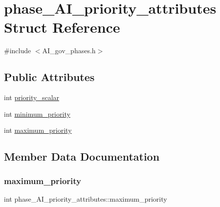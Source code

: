 \hypertarget{structphase__AI__priority__attributes}{}\section{phase\+\_\+\+A\+I\+\_\+priority\+\_\+attributes Struct Reference}
\label{structphase__AI__priority__attributes}


{\ttfamily \#include $<$A\+I\+\_\+gov\+\_\+phases.\+h$>$}

\subsection*{Public Attributes}
\begin{DoxyCompactItemize}
\item 
int \hyperlink{structphase__AI__priority__attributes_a090c7eda71597fed95fee617ab6c256b}{priority\+\_\+scalar}
\item 
int \hyperlink{structphase__AI__priority__attributes_adc44b3832777cbe2198eaf47e716418d}{minimum\+\_\+priority}
\item 
int \hyperlink{structphase__AI__priority__attributes_a5efa1d1cba224f32272e1883f8e27384}{maximum\+\_\+priority}
\end{DoxyCompactItemize}


\subsection{Member Data Documentation}
\mbox{\label{structphase__AI__priority__attributes_a5efa1d1cba224f32272e1883f8e27384}} 
\subsubsection{\texorpdfstring{maximum\+\_\+priority}{maximum\_priority}}
{\footnotesize\ttfamily int phase\+\_\+\+A\+I\+\_\+priority\+\_\+attributes\+::maximum\+\_\+priority}

\mbox{\label{structphase__AI__priority__attributes_adc44b3832777cbe2198eaf47e716418d}} 
